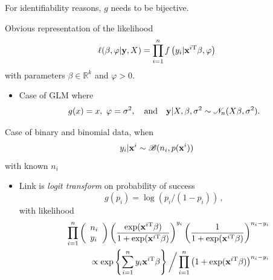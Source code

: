 \begin{slide}
\pause
\vs For identifiability reasons, $g$ needs to be bijective. 

\end{slide}\begin{slide}

Obvious representation of the likelihood 
$$
\ell(\beta,\varphi|\mathbf{y},X) = \prod_{i=1}^nf\left(y_i|\mathbf{x}^{i\mathrm{T}}\beta,\varphi\right)
$$
with parameters $\beta\in\mathbb{R}^k$ and $\varphi>0$.

\end{slide}\begin{slide}

\begin{itemize}
\item {}

Case of GLM where 
$$
g(x)=x,\ 
\varphi=\sigma^2,\quad\text{and}\quad
\by|X,\beta,\sigma^2\sim\mathscr{N}_n(X\beta,\sigma^2).
$$
\end{itemize}

\end{slide}\begin{slide}

Case of binary and binomial data, when 
$$
y_i|\mathbf{x}^i\sim\mathscr{B}(n_i,p(\mathbf{x}^i))
$$
with known $n_i$

\begin{itemize}
\item {}

Link is {\em logit transform} on probability of success
$$
g(p_i)=\log(p_i/(1-p_i))\,,
$$
with likelihood 
\footnotesize \begin{eqnarray*}
&& \prod_{i=1}^n\left(\begin{array}{l} n_i \\ y_i \end{array}\right)
\left(\frac{\exp(\mathbf{x}^{i\mathrm{T}}\beta)}{1+\exp(\mathbf{x}^{i\mathrm{T}}\beta)}\right)^{y_i}
\left(\frac{1}{1+\exp(\mathbf{x}^{i\mathrm{T}}\beta)}\right)^{n_i-y_i}\\
&&\qquad \propto \exp \left\{ \sum_{i=1}^n y_i\mathbf{x}^{i\mathrm{T}}\beta \right\}
\bigg/ \prod_{i=1}^n \left(1+\exp(\mathbf{x}^{i\mathrm{T}}\beta)\right)^{n_i-y_i}\nonumber
\end{eqnarray*}
\normalsize
\end{itemize}

\end{slide}\begin{slide}
\slidetitle{Canonical link}


\end{slide}
